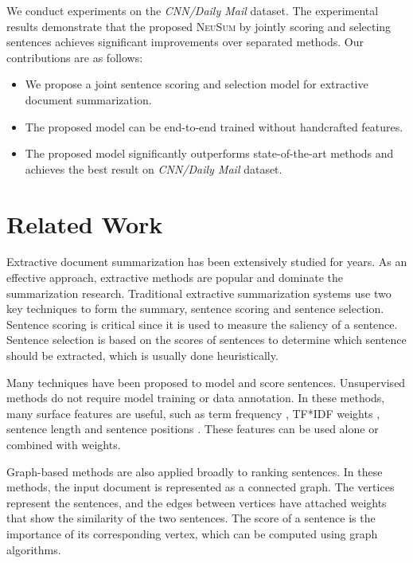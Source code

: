 \documentclass[11pt,a4paper]{article}
\newcommand{\ourModelName}{\textsc{NeuSum}}
\newcommand{\cnndm}{\textit{CNN/Daily Mail}}
\begin{document}
We conduct experiments on the \cnndm{} dataset.
The experimental results demonstrate that the proposed \ourModelName{} by jointly scoring and selecting sentences achieves significant improvements over  separated methods.
Our contributions are as follows:
\begin{itemize}
	\item We propose a joint sentence scoring and selection model for extractive document summarization.
	\item The proposed model can be end-to-end trained without handcrafted features.
	\item The proposed model significantly outperforms state-of-the-art methods  and achieves the best result on \cnndm{} dataset.
\end{itemize}





 \section{Related Work}
Extractive document summarization has been extensively studied for years.
As an effective approach, extractive methods are popular and dominate the summarization research.
Traditional extractive summarization systems use two key techniques to form the summary, sentence scoring and sentence selection.
Sentence scoring is critical since it is used to measure the saliency of a sentence.
Sentence selection is based on the scores of sentences to determine which sentence should be extracted, which is usually done heuristically.

Many techniques have been proposed to model and score sentences.
Unsupervised methods do not require model training or data annotation.
In these methods, many surface features are useful, such as term frequency \cite{luhn1958automatic}, TF*IDF weights \cite{erkan2004lexrank}, sentence length \cite{cao2015ranking} and sentence positions \cite{Ren:2017:LCS:3077136.3080792}.
These features can be used alone or combined with weights.

Graph-based methods \cite{erkan2004lexrank,mihalcea2004textrank,wan2006improved} are also applied broadly to ranking sentences.
In these methods, the input document is represented as a connected graph.
The vertices represent the sentences, and the edges between vertices have attached weights that show the similarity of the two sentences.
The score of a sentence is the importance of its corresponding vertex, which can be computed using graph algorithms.
\end{document}
